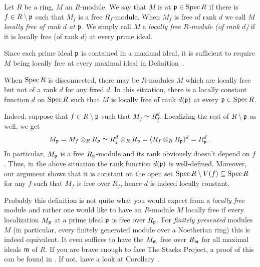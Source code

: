 \documentclass[a4paper,parskip=half,numbers=enddot, DIV=12]{scrreprt}
\begin{document}
\begin{defi} 
    Let $R$ be a ring, $M$ an $R$-module. We say that $M$ is  at $\mathfrak{p}\in \operatorname{Spec} R$ if there is $f\in R\setminus\mathfrak{p}$ such that $M_f$ is a free $R_f$-module. When $M_f$ is free of rank $d$ we call $M$ \emph{locally free of rank $d$ at $\mathfrak{p}$}. We simply call $M$ a \emph{locally free $R$-module (of rank $d$)} if it is locally free (of rank $d$) at every prime ideal.
\end{defi}
\begin{rem*}
	\begin{alphanumerate}
		\item Since each prime ideal $\mathfrak{p}$ is contained in a maximal ideal, it is sufficient to require $M$ being locally free at every maximal ideal in Definition~.
		\item When $\operatorname{Spec} R$ is disconnected, there may be $R$-modules $M$ which are locally free but not of a rank $d$ for any fixed $d$. In this situation, there is a locally constant function $d$ on $\operatorname{Spec} R$ such that $M$ is locally free of rank $d(\mathfrak{p})$ at every $\mathfrak{p}\in \operatorname{Spec} R$.
		
		Indeed, suppose that $f\in R\setminus\mathfrak{p}$ such that $M_f\simeq R_f^d$. Localizing the rest of $R\setminus \mathfrak{p}$ as well, we get
		\begin{align*}
			M_{\mathfrak{p}}=M_f\otimes_RR_{\mathfrak{p}}\simeq R_f^d\otimes_R R_{\mathfrak{p}}=(R_f\otimes_RR_{\mathfrak{p}})^d=R_{\mathfrak{p}}^d\;.
		\end{align*}
		In particular, $M_{\mathfrak{p}}$ is a free $R_{\mathfrak{p}}$-module and its rank obviously doesn't depend on $f$. Thus, in the above situation the rank function $d(\mathfrak{p})$ is well-defined. Moreover, our argument shows that it is constant on the open set $\operatorname{Spec} R\setminus V(f)\subseteq \operatorname{Spec} R$ for any $f$ such that $M_f$ is free over $R_f$, hence $d$ is indeed locally constant.
		\item Probably this definition is not quite what you would expect from a \emph{locally free} module and rather one would like to have an $R$-module $M$ locally free if every localization $M_{\mathfrak{p}}$ at a prime ideal $\mathfrak{p}$ is free over $R_{\mathfrak{p}}$. For \emph{finitely presented} modules $M$ (in particular, every finitely generated module over a Noetherian ring) this is indeed equivalent. It even suffices to have the $M_{\mathfrak{m}}$ free over $R_{\mathfrak{m}}$ for all maximal ideals $\mathfrak{m}$ of $R$. If you are brave enough to face The Stacks Project, a proof of this can be found in \cite[Tag 00NX]{stacks-project}. If not, have a look at Corollary~. 
	\end{alphanumerate}
\end{rem*}
\end{document}
